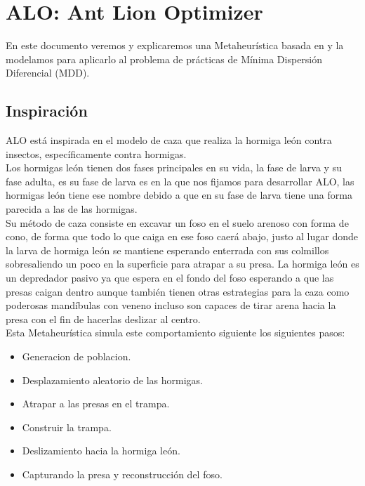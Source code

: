 \section{ALO: Ant Lion Optimizer}
En este documento veremos y explicaremos una Metaheurística basada en \cite{or} y la modelamos
para aplicarlo al problema de prácticas de Mínima Dispersión Diferencial (MDD).
 
 
 
\subsection{Inspiración}
  ALO está inspirada en el modelo de caza que realiza la hormiga león contra insectos, específicamente contra
  hormigas.\\
  Los hormigas león tienen dos fases principales en su vida, la fase de larva y su fase adulta, es su fase de
  larva es en la que nos fijamos para desarrollar ALO, las hormigas león tiene ese nombre debido a que en su
  fase de larva tiene una forma parecida a las de las hormigas.\\
  Su método de caza consiste en excavar un foso en el suelo arenoso con forma de cono, de forma que todo lo que
   caiga en ese foso caerá abajo, justo al lugar donde la larva de hormiga león se mantiene esperando enterrada
   con sus colmillos sobresaliendo un poco en la superficie para atrapar a su presa.
  La hormiga león es un depredador pasivo ya que espera en el fondo del foso esperando a que las presas caigan
   dentro aunque también tienen otras estrategias para la caza como poderosas mandíbulas con veneno incluso son capaces
  de tirar arena hacia la presa con el fin de hacerlas deslizar al centro.\\
 
  Esta Metaheurística simula este comportamiento siguiente los siguientes pasos:\\

  \begin{itemize}
    \item Generacion de poblacion.
    \item Desplazamiento aleatorio de las hormigas.
    \item Atrapar a las presas en el trampa.
    \item Construir la trampa.
    \item Deslizamiento hacia la hormiga león.
    \item Capturando la presa y reconstrucción del foso.
  \end{itemize}

